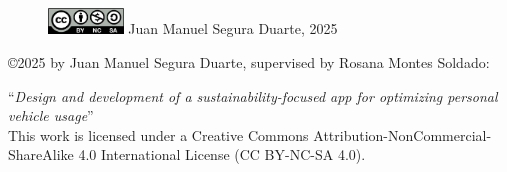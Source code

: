 \vspace*{\fill}

\begin{figure}[H]
    \includegraphics[width=2cm]{images/prefaces/by-nc-sa.png} Juan Manuel Segura Duarte, 2025
\end{figure}

\copyright 2025 by Juan Manuel Segura Duarte, supervised by Rosana Montes Soldado:

``\textit{Design and development of a sustainability-focused app for optimizing personal vehicle usage}'' \\

This work is licensed under a Creative Commons Attribution-NonCommercial-ShareAlike 4.0 International License (CC BY-NC-SA 4.0).

